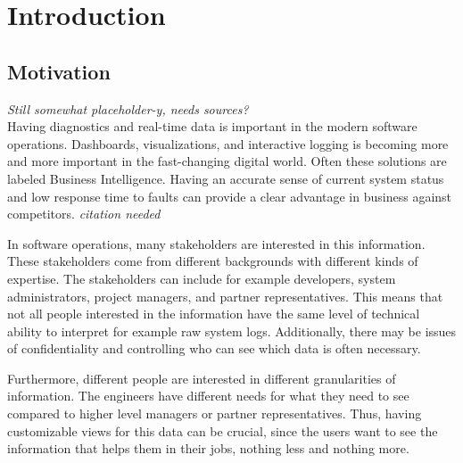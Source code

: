 \documentclass[english,12pt,a4paper,pdftex,sci,utf8]{aaltothesis}
\newcommand{\nyi}[1]{\colorbox{nyibg}{\textcolor{nyitext}{\emph{#1}}}}
\begin{document}

\section{Introduction}
\thispagestyle{empty}

\subsection{Motivation}
\nyi{Still somewhat placeholder-y, needs sources?} \\

Having diagnostics and real-time data is important in the modern software operations.
Dashboards, visualizations, and interactive logging is becoming more and more important
in the fast-changing digital world. Often these solutions are labeled Business Intelligence.
Having an accurate sense of current system status and low response time to faults can provide a clear advantage
in business against competitors. \nyi{citation needed}


In software operations, many stakeholders are interested in this information. 
These stakeholders come from different backgrounds with different kinds of expertise.
The stakeholders can include for example developers, system administrators, project managers, and partner representatives.
This means that not all people interested in the information have the same level of technical ability to 
interpret for example raw system logs. Additionally, there may be issues of confidentiality and
controlling who can see which data is often necessary.

Furthermore, different people are interested in different granularities of information.
The engineers have different needs for what they need to see compared to higher level managers
or partner representatives.
Thus, having customizable views for this data can be crucial,
since the users want to see the information that helps them in their jobs, nothing less and nothing more.
\end{document}
